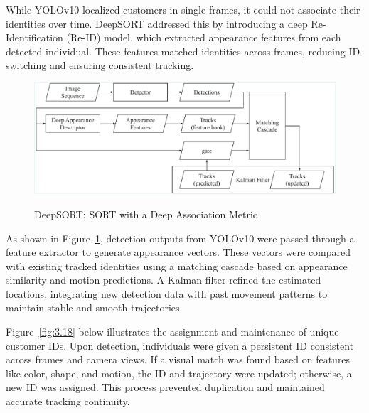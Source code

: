 {While YOLOv10 localized customers in single frames, it could not associate their identities over time. DeepSORT addressed this by introducing a deep Re-Identification (Re-ID) model, which extracted appearance features from each detected individual. These features matched identities across frames, reducing ID-switching and ensuring consistent tracking.

\begin{figure}[H]
	\caption[DeepSORT: SORT with a Deep Association Metric \citep{Admin2023}]{\newline \newline DeepSORT: SORT with a Deep Association Metric \citep{Admin2023}}
	\centering
	\includegraphics[width=0.75\linewidth]{fig/3.17.pdf}
	\label{fig:3.17}
\end{figure}

As shown in Figure~\ref{fig:3.17}, detection outputs from YOLOv10 were passed through a feature extractor to generate appearance vectors. These vectors were compared with existing tracked identities using a matching cascade based on appearance similarity and motion predictions. A Kalman filter refined the estimated locations, integrating new detection data with past movement patterns to maintain stable and smooth trajectories.

Figure~\ref{fig:3.18} below illustrates the assignment and maintenance of unique customer IDs. Upon detection, individuals were given a persistent ID consistent across frames and camera views. If a visual match was found based on features like color, shape, and motion, the ID and trajectory were updated; otherwise, a new ID was assigned. This process prevented duplication and maintained accurate tracking continuity.

}
